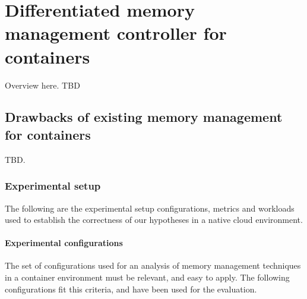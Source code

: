 
\chapter{Differentiated memory management controller for containers}

  Overview here. TBD
  
  \section{Drawbacks of existing memory management for containers}
  \label{sec:controller_issues}
  
    TBD.
    
    \subsection{Experimental setup}
    
      The following are the experimental setup configurations, metrics and workloads used to establish the correctness of our hypotheses
      in a native cloud environment.
      
       \subsubsection{Experimental configurations}
    
	The set of configurations used for an analysis of memory management techniques in a container environment must be relevant, 
	and easy to apply. The following configurations fit this criteria, and have been used for the evaluation.
	

